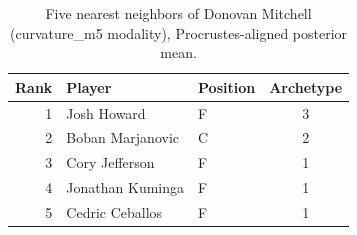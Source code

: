 \begin{table}[htbp]
  \centering\small
  \begin{tabular}{rllc}
    \toprule
    Rank & Player & Position & Archetype \\
    \midrule
    1 & Josh Howard & F & 3 \\
    2 & Boban Marjanovic & C & 2 \\
    3 & Cory Jefferson & F & 1 \\
    4 & Jonathan Kuminga & F & 1 \\
    5 & Cedric Ceballos & F & 1 \\
    \bottomrule
  \end{tabular}
  \caption{Five nearest neighbors of Donovan Mitchell (curvature_m5 modality), Procrustes-aligned posterior mean.}
  \label{tab:Donovan_Mitchell_neighbors_curvature_m5}
\end{table}

